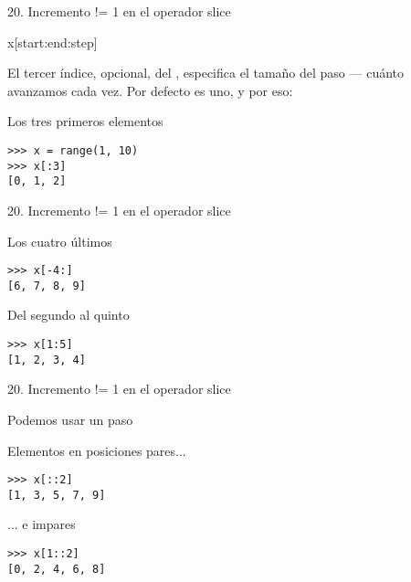 
\begin{frame}[fragile]
  {20. \large Incremento != 1 en el operador slice}
  \begin{block}{}
    \centering \LARGE x[start:end:step]
  \end{block}

  \small
  \begin{center}
    El tercer índice, opcional, del ,
    especifica el tamaño del paso --- cuánto avanzamos cada vez.
    Por defecto es uno, y por eso:
  \end{center}

  \begin{exampleblock}
    {Los tres primeros elementos}
    \begin{lstlisting}
>>> x = range(1, 10)
>>> x[:3]
[0, 1, 2]
    \end{lstlisting}
  \end{exampleblock}
\end{frame}

\begin{frame}[fragile]
  {20. \large Incremento != 1 en el operador slice}
  \begin{exampleblock}
    {Los cuatro últimos}
    \begin{lstlisting}
>>> x[-4:]
[6, 7, 8, 9]
    \end{lstlisting}
  \end{exampleblock}

  \begin{exampleblock}
    {Del segundo al quinto}
    \begin{lstlisting}
>>> x[1:5]
[1, 2, 3, 4]
    \end{lstlisting}
  \end{exampleblock}
\end{frame}

\begin{frame}[fragile]
  {20. \large Incremento != 1 en el operador slice}
  \begin{block}{}
    \large
    \centering
    Podemos usar un paso 
  \end{block}

  \small
  \begin{exampleblock}
    {Elementos en posiciones pares...}
    \begin{lstlisting}
>>> x[::2]
[1, 3, 5, 7, 9]
    \end{lstlisting}
  \end{exampleblock}

  \begin{exampleblock}
    {... e impares}
    \begin{lstlisting}
>>> x[1::2]
[0, 2, 4, 6, 8]
    \end{lstlisting}
  \end{exampleblock}
\end{frame}

